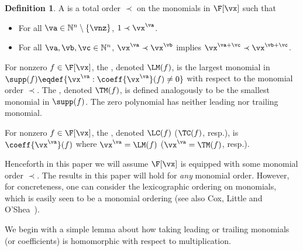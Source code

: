 \documentclass[11pt]{article}
\numberwithin{equation}{section}
\theoremstyle{definition}
\newtheorem{definition}[theorem]{Definition}
\theoremstyle{plain}
\newcommand{\N}{\mathbb N}
\begin{document}
\begin{definition}
        A  is a total order $\prec$ on the monomials in $\F[\vx]$ such that
        \begin{itemize}
                \item For all $\va\in\N^n\setminus\{\vnz\}$, $1\prec \vx^{\va}$.
                \item For all $\va,\vb,\vc\in\N^n$, $\vx^\va\prec\vx^\vb$ implies $\vx^{\va+\vc}\prec\vx^{\vb+\vc}$.
        \end{itemize}

        For nonzero $f\in\F[\vx]$, the , denoted $\LM(f)$, is the largest monomial in $\supp(f)\eqdef\{\vx^\va:\coeff{\vx^\va}(f)\ne 0\}$ with respect to the monomial order $\prec$. The , denoted $\TM(f)$, is defined analogously to be the smallest monomial in $\supp(f)$. The zero polynomial has neither leading nor trailing monomial.

%
%
%
%
%
%
%
 For nonzero $f\in\F[\vx]$, the , denoted $\LC(f)$ ($\TC(f)$, resp.), is $\coeff{\vx^\va}(f)$
 where $\vx^\va=\LM(f)$ ($\vx^\va=\TM(f)$, resp.).
\end{definition}

Henceforth in this paper we will assume $\F[\vx]$ is equipped with some monomial order $\prec$.  The results in this paper will hold for \emph{any} monomial order.  However, for concreteness, one can consider the lexicographic ordering on monomials, which is easily seen to be a monomial ordering (see also Cox, Little and O'Shea~\cite{CoxLittleOShea07}).

We begin with a simple lemma about how taking leading or trailing monomials (or coefficients) is homomorphic with respect to multiplication.
\end{document}
